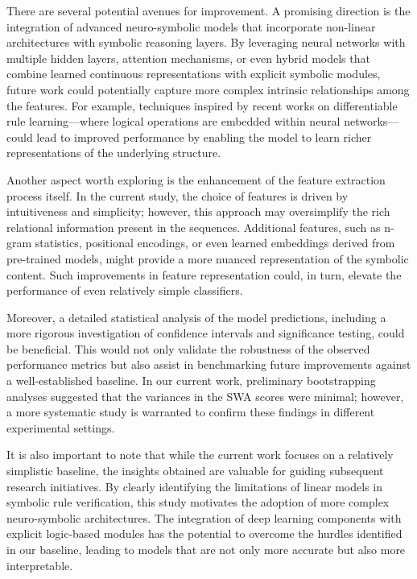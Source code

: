 \documentclass{article}
\begin{document}
There are several potential avenues for improvement. A promising direction is the integration of advanced neuro-symbolic models that incorporate non-linear architectures with symbolic reasoning layers. By leveraging neural networks with multiple hidden layers, attention mechanisms, or even hybrid models that combine learned continuous representations with explicit symbolic modules, future work could potentially capture more complex intrinsic relationships among the features. For example, techniques inspired by recent works on differentiable rule learning—where logical operations are embedded within neural networks—could lead to improved performance by enabling the model to learn richer representations of the underlying structure.

Another aspect worth exploring is the enhancement of the feature extraction process itself. In the current study, the choice of features is driven by intuitiveness and simplicity; however, this approach may oversimplify the rich relational information present in the sequences. Additional features, such as n-gram statistics, positional encodings, or even learned embeddings derived from pre-trained models, might provide a more nuanced representation of the symbolic content. Such improvements in feature representation could, in turn, elevate the performance of even relatively simple classifiers.

Moreover, a detailed statistical analysis of the model predictions, including a more rigorous investigation of confidence intervals and significance testing, could be beneficial. This would not only validate the robustness of the observed performance metrics but also assist in benchmarking future improvements against a well-established baseline. In our current work, preliminary bootstrapping analyses suggested that the variances in the SWA scores were minimal; however, a more systematic study is warranted to confirm these findings in different experimental settings.

It is also important to note that while the current work focuses on a relatively simplistic baseline, the insights obtained are valuable for guiding subsequent research initiatives. By clearly identifying the limitations of linear models in symbolic rule verification, this study motivates the adoption of more complex neuro-symbolic architectures. The integration of deep learning components with explicit logic-based modules has the potential to overcome the hurdles identified in our baseline, leading to models that are not only more accurate but also more interpretable.
\end{document}
